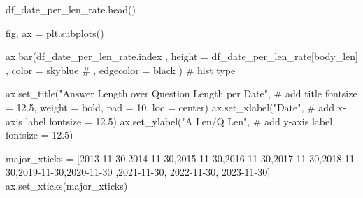 \documentclass[
  letterpaper,
  DIV=11,
  numbers=noendperiod]{scrartcl}
\newenvironment{Shaded}{\begin{snugshade}}{\end{snugshade}}
\newcommand{\CommentTok}[1]{\textcolor[rgb]{0.37,0.37,0.37}{#1}}
\newcommand{\DecValTok}[1]{\textcolor[rgb]{0.68,0.00,0.00}{#1}}
\newcommand{\FloatTok}[1]{\textcolor[rgb]{0.68,0.00,0.00}{#1}}
\newcommand{\NormalTok}[1]{\textcolor[rgb]{0.00,0.23,0.31}{#1}}
\newcommand{\OperatorTok}[1]{\textcolor[rgb]{0.37,0.37,0.37}{#1}}
\newcommand{\StringTok}[1]{\textcolor[rgb]{0.13,0.47,0.30}{#1}}
\begin{document}
\begin{Shaded}
\begin{Highlighting}[]
\NormalTok{df\_date\_per\_len\_rate.head()}
\end{Highlighting}
\end{Shaded}

\begin{Shaded}
\begin{Highlighting}[]
\NormalTok{fig, ax }\OperatorTok{=}\NormalTok{ plt.subplots()}

\NormalTok{ax.bar(df\_date\_per\_len\_rate.index}
\NormalTok{    ,  height }\OperatorTok{=}\NormalTok{ df\_date\_per\_len\_rate[}\StringTok{\textquotesingle{}body\_len\textquotesingle{}}\NormalTok{]}
\NormalTok{    ,  color }\OperatorTok{=} \StringTok{\textquotesingle{}skyblue\textquotesingle{}}
    \CommentTok{\# ,  edgecolor = \textquotesingle{}black\textquotesingle{}}
\NormalTok{      ) }\CommentTok{\# hist type}

\NormalTok{ax.set\_title(}\StringTok{"Answer Length over Question Length per Date"}\NormalTok{, }\CommentTok{\# add title}
\NormalTok{             fontsize }\OperatorTok{=} \FloatTok{12.5}\NormalTok{,}
\NormalTok{             weight }\OperatorTok{=} \StringTok{\textquotesingle{}bold\textquotesingle{}}\NormalTok{,}
\NormalTok{             pad }\OperatorTok{=} \DecValTok{10}\NormalTok{,}
\NormalTok{             loc }\OperatorTok{=} \StringTok{\textquotesingle{}center\textquotesingle{}}\NormalTok{)}
\NormalTok{ax.set\_xlabel(}\StringTok{"Date"}\NormalTok{, }\CommentTok{\# add x{-}axis label}
\NormalTok{              fontsize }\OperatorTok{=} \FloatTok{12.5}\NormalTok{)}
\NormalTok{ax.set\_ylabel(}\StringTok{"A Len/Q Len"}\NormalTok{, }\CommentTok{\# add y{-}axis label}
\NormalTok{              fontsize }\OperatorTok{=} \FloatTok{12.5}\NormalTok{)}

\NormalTok{major\_xticks }\OperatorTok{=}\NormalTok{ [}\StringTok{\textquotesingle{}2013{-}11{-}30\textquotesingle{}}\NormalTok{,}\StringTok{\textquotesingle{}2014{-}11{-}30\textquotesingle{}}\NormalTok{,}\StringTok{\textquotesingle{}2015{-}11{-}30\textquotesingle{}}\NormalTok{,}\StringTok{\textquotesingle{}2016{-}11{-}30\textquotesingle{}}\NormalTok{,}\StringTok{\textquotesingle{}2017{-}11{-}30\textquotesingle{}}\NormalTok{,}\StringTok{\textquotesingle{}2018{-}11{-}30\textquotesingle{}}\NormalTok{,}\StringTok{\textquotesingle{}2019{-}11{-}30\textquotesingle{}}\NormalTok{,}\StringTok{\textquotesingle{}2020{-}11{-}30\textquotesingle{}}
\NormalTok{                ,}\StringTok{\textquotesingle{}2021{-}11{-}30\textquotesingle{}}\NormalTok{, }\StringTok{\textquotesingle{}2022{-}11{-}30\textquotesingle{}}\NormalTok{, }\StringTok{\textquotesingle{}2023{-}11{-}30\textquotesingle{}}\NormalTok{]}
\NormalTok{ax.set\_xticks(major\_xticks)}


\end{Highlighting}
\end{Shaded}
\end{document}
